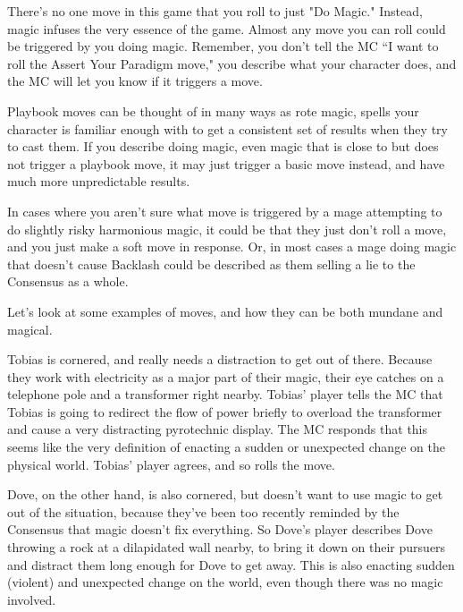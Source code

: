 \documentclass[
  oneside,
  statementpaper,
  9pt]{memoir}
\begin{document}
\begin{Player}

There’s no one move in this game that you roll to just "Do Magic." Instead, magic infuses the very essence of the game. Almost any move you can roll could be triggered by you doing magic. Remember, you don’t tell the MC “I want to roll the Assert Your Paradigm move," you describe what your character does, and the MC will let you know if it triggers a move. 

Playbook moves can be thought of in many ways as rote magic, spells your character is familiar enough with to get a consistent set of results when they try to cast them. If you describe doing magic, even magic that is close to but does not trigger a playbook move, it may just trigger a basic move instead, and have much more unpredictable results.

\end{Player}

\begin{MC}

In cases where you aren't sure what move is triggered by a mage attempting to do slightly risky harmonious magic, it could be that they just don’t roll a move, and you just make a soft move in response. Or, in most cases a mage doing magic that doesn’t cause Backlash could be described as them selling a lie to the Consensus as a whole.

\end{MC}

\begin{Narrator}

Let’s look at some examples of moves, and how they can be both mundane and magical.

Tobias is cornered, and really needs a distraction to get out of there. Because they work with electricity as a major part of their magic, their eye catches on a telephone pole and a transformer right nearby. Tobias’ player tells the MC that Tobias is going to redirect the flow of power briefly to overload the transformer and cause a very distracting pyrotechnic display. The MC responds that this seems like the very definition of enacting a sudden or unexpected change on the physical world. Tobias’ player agrees, and so rolls the move.

Dove, on the other hand, is also cornered, but doesn’t want to use magic to get out of the situation, because they’ve been too recently reminded by the Consensus that magic doesn’t fix everything. So Dove’s player describes Dove throwing a rock at a dilapidated wall nearby, to bring it down on their pursuers and distract them long enough for Dove to get away. This is also enacting sudden (violent) and unexpected change on the world, even though there was no magic involved.

\end{Narrator}
\end{document}
